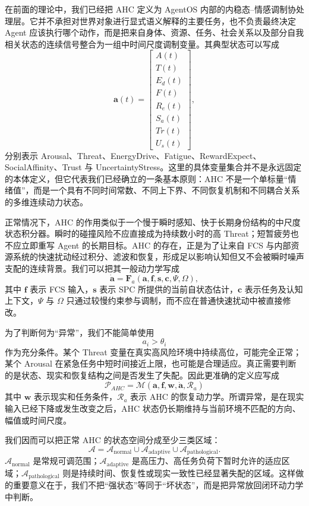 在前面的理论中，我们已经把 AHC 定义为 AgentOS 内部的内稳态--情感调制协处理层。它并不承担对世界对象进行显式语义解释的主要任务，也不负责最终决定 Agent 应该执行哪个动作，而是把来自身体、资源、任务、社会关系以及部分自我相关状态的连续信号整合为一组中时间尺度调制变量。其典型状态可以写成
\[
\mathbf a(t)
=
\begin{bmatrix}
A(t)\\
T(t)\\
E_d(t)\\
F(t)\\
R_e(t)\\
S_a(t)\\
Tr(t)\\
U_s(t)
\end{bmatrix},
\]
分别表示 Arousal、Threat、EnergyDrive、Fatigue、RewardExpect、SocialAffinity、Trust 与 UncertaintyStress。这里的具体变量集合并不是永远固定的本体定义，但它代表我们已经确立的一条基本原则：AHC 不是一个单标量“情绪值”，而是一个具有不同时间常数、不同上下界、不同恢复机制和不同耦合关系的多维连续动力状态。

正常情况下，AHC 的作用类似于一个慢于瞬时感知、快于长期身份结构的中尺度状态积分器。瞬时的碰撞风险不应直接成为持续数小时的高 Threat；短暂疲劳也不应立即重写 Agent 的长期目标。AHC 的存在，正是为了让来自 FCS 与内部资源系统的快速扰动经过积分、滤波和恢复，形成足以影响认知但又不会被瞬时噪声支配的连续背景。我们可以把其一般动力学写成
\[
\dot{\mathbf a}
=
\mathbf F_a
\left(
\mathbf a,
\mathbf f,
\mathbf s,
\mathbf c,
\Psi,
\Omega
\right),
\]
其中 $\mathbf f$ 表示 FCS 输入，$\mathbf s$ 表示 SPC 所提供的当前自状态估计，$\mathbf c$ 表示任务及认知上下文，$\Psi$ 与 $\Omega$ 只通过较慢约束参与调制，而不应在普通快速扰动中被直接修改。

为了判断何为“异常”，我们不能简单使用
\[
a_i > \theta_i
\]
作为充分条件。某个 Threat 变量在真实高风险环境中持续高位，可能完全正常；某个 Arousal 在紧急任务中短时间接近上限，也可能是合理适应。真正需要判断的是状态、现实和恢复结构之间是否发生了失配。因此更准确的定义应写成
\[
\boxed{
\mathcal P_{AHC}
=
\mathcal M
\left(
\mathbf a,
\mathbf f,
\mathbf w,
\dot{\mathbf a},
\mathcal R_a
\right)
}
\]
其中 $\mathbf w$ 表示现实和任务条件，$\mathcal R_a$ 表示 AHC 的恢复动力学。所谓异常，是在现实输入已经下降或发生改变之后，AHC 状态仍长期维持与当前环境不匹配的方向、幅值或时间尺度。

我们因而可以把正常 AHC 的状态空间分成至少三类区域：
\[
\mathcal A
=
\mathcal A_{\mathrm{normal}}
\cup
\mathcal A_{\mathrm{adaptive}}
\cup
\mathcal A_{\mathrm{pathological}}.
\]
$\mathcal A_{\mathrm{normal}}$ 是常规可调范围；$\mathcal A_{\mathrm{adaptive}}$ 是高压力、高任务负荷下暂时允许的适应区域；$\mathcal A_{\mathrm{pathological}}$ 则是持续时间、恢复性或现实一致性已经显著失配的区域。这样做的重要意义在于，我们不把“强状态”等同于“坏状态”，而是把异常放回闭环动力学中判断。

